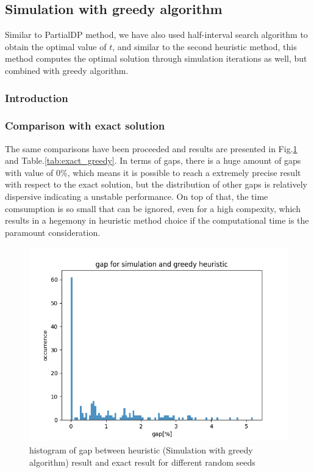 \documentclass{article}
\begin{document}
\subsection{Simulation with greedy algorithm}

Similar to PartialDP method, we have also used half-interval search algorithm to obtain the optimal value of $t$, and similar to the second heuristic method, this method computes the optimal solution through simulation iterations as well, but combined with greedy algorithm.

\subsubsection{Introduction}

\subsubsection{Comparison with exact solution}
The same comparisons have been proceeded and results are presented in Fig.\ref{fig:hist_sg} and Table.\ref{tab:exact_greedy}. In terms of gaps, there is a huge amount of gaps with value of 0\%, which means it is possible to reach a extremely precise result with respect to the exact solution, but the distribution of other gaps is relatively dispersive indicating a unstable performance. On top of that, the time comsumption is so small that can be ignored, even for a high compexity, which results in a hegemony in heuristic method choice if the computational time is the paramount consideration.

\begin{figure}[ht]
    \centering
    \includegraphics[scale=0.7]{hist_sg.png}
    \caption{histogram of gap between heuristic (Simulation with greedy algorithm) result and exact result for different random seeds}
    \label{fig:hist_sg}
\end{figure}
\end{document}
